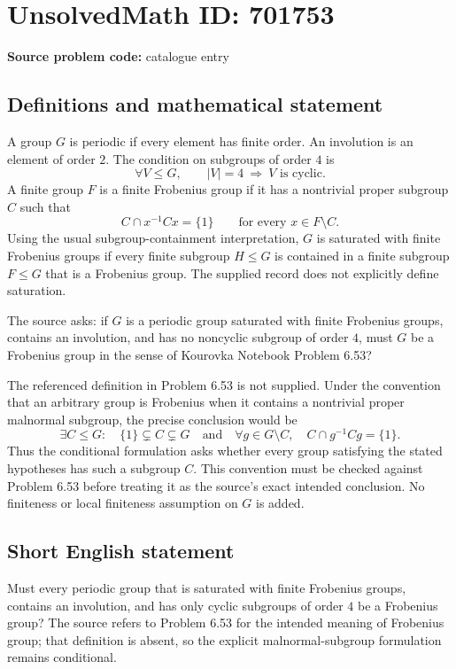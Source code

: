\documentclass[11pt]{article}
\begin{document}
\section*{UnsolvedMath ID: 701753}
\textbf{Source problem code:} catalogue entry
\subsection{Definitions and mathematical statement}
A group \(G\) is periodic if every element has finite order. An involution is an element of order \(2\). The condition on subgroups of order \(4\) is
\[
\forall V\leq G,\qquad |V|=4\ \Longrightarrow\ V\text{ is cyclic}.
\]
A finite group \(F\) is a finite Frobenius group if it has a nontrivial proper subgroup \(C\) such that
\[
C\cap x^{-1}Cx=\{1\}\qquad\text{for every }x\in F\setminus C.
\]
Using the usual subgroup-containment interpretation, \(G\) is saturated with finite Frobenius groups if every finite subgroup \(H\leq G\) is contained in a finite subgroup \(F\leq G\) that is a Frobenius group. The supplied record does not explicitly define saturation.

The source asks: if \(G\) is a periodic group saturated with finite Frobenius groups, contains an involution, and has no noncyclic subgroup of order \(4\), must \(G\) be a Frobenius group in the sense of Kourovka Notebook Problem 6.53?

The referenced definition in Problem 6.53 is not supplied. Under the convention that an arbitrary group is Frobenius when it contains a nontrivial proper malnormal subgroup, the precise conclusion would be
\[
\exists C\leq G:\quad \{1\}\subsetneq C\subsetneq G
\quad\text{and}\quad
\forall g\in G\setminus C,\quad C\cap g^{-1}Cg=\{1\}.
\]
Thus the conditional formulation asks whether every group satisfying the stated hypotheses has such a subgroup \(C\). This convention must be checked against Problem 6.53 before treating it as the source's exact intended conclusion. No finiteness or local finiteness assumption on \(G\) is added.
\subsection{Short English statement}
Must every periodic group that is saturated with finite Frobenius groups, contains an involution, and has only cyclic subgroups of order \(4\) be a Frobenius group? The source refers to Problem 6.53 for the intended meaning of Frobenius group; that definition is absent, so the explicit malnormal-subgroup formulation remains conditional.
\end{document}
